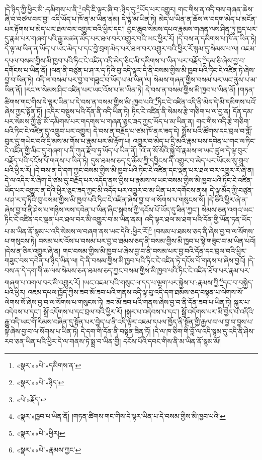 །དེ་ཉིད་ཀྱི་ཕྱིར་མི་:དམིགས་པ་ནི་\footnote{«སྣར་»«པེ་»དམིགས་ན་}འདི་ཇི་ལྟར་ཞི་བ་:ཉིད་དུ་\footnote{«སྣར་»«པེ་»ཉིད་}ཡོད་པར་འགྱུར། གང་གིས་ན་འདི་བས་གཞན་ཆེས་ཞི་བ་བཙལ་བར་བྱ། འདི་ཡོད་པ་ཁོ་ན་མ་ཡིན་ནམ། དེ་ལྟ་མ་ཡིན་ཏེ། མེད་པ་ཡིན་ན་ཆོས་ལ་བདག་མེད་པ་མངོན་པར་རྟོགས་པ་མེད་པར་ཐལ་བར་འགྱུར་བའི་ཕྱིར་དང་། བྱང་ཆུབ་སེམས་དཔའ་རྣམས་གཞན་ལས་ཤིན་ཏུ་ཁྱད་པར་དུ་རྣམ་པར་གཞག་པའི་རྒྱུ་མཚན་མེད་པར་ཐལ་བར་འགྱུར་བའི་ཡང་ཕྱིར་རོ། །དེ་བས་ན་དམིགས་པ་ཁོ་ན་ཡིན་ཏེ། དེ་ལྟ་མ་ཡིན་ན་ཡོད་པ་ཡང་མེད་པ་དང་བྱེ་བྲག་མེད་པར་ཐལ་བར་འགྱུར་བའི་ཕྱིར་རོ་སྙམ་དུ་སེམས་པ་ལ། འཇམ་དཔལ་བསམ་གྱིས་མི་ཁྱབ་པའི་ཏིང་ངེ་འཛིན་འདི་མེད་ཅིང་མི་དམིགས་པ་ཡིན་པར་བརྗོད་\footnote{«པེ་»རྗོད་}དམ་ཅི་ཞེས་བྱ་བ་དགོངས་པ་ཡིན་ནོ། །ལན་ནི་བཙུན་པ་ཤ་ར་དྭ་ཏིའི་བུ་འདི་ལྟར་དེ་ནི་བསམ་གྱིས་མི་ཁྱབ་པའི་ཏིང་ངེ་འཛིན་ཏེ་ཞེས་བྱ་བ་ཡིན་ཏེ། འདི་ལ་བསམ་པར་བྱ་བ་གཟུང་བ་ཡོད་པ་མ་ཡིན་ལ། སེམས་གཞན་གྱིས་བསམ་པར་ཡང་ནུས་པ་མ་ཡིན་ནོ། །རང་ལ་སེམས་ཤིང་འཛིན་པར་ཡང་འོས་པ་མ་ཡིན་ཏེ། དེ་བས་ན་བསམ་གྱིས་མི་ཁྱབ་པ་ཡིན་ནོ། །གཏན་ཚིགས་གང་གིས་དེ་ལྟར་ཡིན་པ་དེ་བས་ན་བསམ་གྱིས་མི་:ཁྱབ་པའི་\footnote{«སྣར་»ཁྱབ་པ་ཡིན་ནོ། །གཏན་ཚིགས་གང་གིས་དེ་ལྟར་ཡིན་པ་དེ་བསམ་གྱིས་མི་ཁྱབ་པའི་}ཏིང་ངེ་འཛིན་འདི་ནི་མེད་དེ་མི་དམིགས་པའོ་ཞེས་ཀྱང་སྟོན་ཏོ། །འདིར་བསྡུས་པའི་དོན་ནི་འདི་ཡིན་ཏེ། ཏིང་ངེ་འཛིན་ནི་སེམས་རྩེ་གཅིག་པ་ལ་བྱ་ན། དོན་དམ་པར་སེམས་ཀྱི་རྩེ་མོ་དམིགས་པར་གདགས་པ་གཞན་ཅུང་ཟད་ཀྱང་ཡོད་པ་མ་ཡིན་ན། གང་གིས་འདི་རྩེ་གཅིག་པའི་ཏིང་ངེ་འཛིན་དུ་འགྲུབ་པར་འགྱུར། དེ་བས་ན་བརྗོད་པ་ཙམ་ཁོ་ནར་ཟད་དེ། སྤྲོས་པའི་ཚོགས་དང་བྲལ་བ་གློ་བུར་དུ་གཡེང་བའི་དྲི་མས་མ་གོས་པ་རྣམ་པར་མི་རྟོག་པ། འགྱུར་བ་མེད་པ་དྲི་མའི་རྣམ་པས་དབེན་པ་གང་ལ་ཏིང་ངེ་འཛིན་གྱི་མིང་དུ་གཞག་པ་ནི་ཀུན་རྫོབ་ཏུ་ཡོད་པ་ཡིན་ནོ། །འོ་ན་སོ་སོའི་སྐྱེ་བོ་རྣམས་ལ་ཡང་ཚུལ་དེ་ལྟ་བུར་བརྗོད་པའི་དངོས་པོ་གནས་པ་ཡིན་ཏེ། དུས་ཐམས་ཅད་དུ་ཆོས་ཀྱི་དབྱིངས་ནི་འགྱུར་བ་མེད་པར་ཡོངས་སུ་གྲུབ་པའི་ཕྱིར་རོ། །དེ་བས་ན་དེ་དག་ཀྱང་བསམ་གྱིས་མི་ཁྱབ་པའི་ཏིང་ངེ་འཛིན་དང་ལྡན་པར་ཐལ་བར་འགྱུར་རོ་ཞེ་ན། དེ་ལ་འདིར་རེ་ཞིག་དེ་ཙམ་དུ་བརྗོད་པར་འདོད་ནས་བྱིས་པ་རྣམས་ལ་ཡང་བསམ་གྱིས་མི་ཁྱབ་པའི་ཏིང་ངེ་འཛིན་ཡོད་པར་འགྱུར་ན་དེའི་ཕྱིར་ཅུང་ཟད་ཀྱང་མི་འདོད་པར་འགྱུར་བ་མ་ཡིན་པར་དགོངས་ནས། དེ་ལྟ་མོད་ཀྱི་བཙུན་པ་ཤ་ར་དྭ་ཏིའི་བུ་བསམ་གྱིས་མི་ཁྱབ་པའི་ཏིང་ངེ་འཛིན་ཞེས་བྱ་བ་ལ་སོགས་པ་གསུངས་སོ། །དེ་ཅིའི་ཕྱིར་ཞེ་ན་ཞེས་བྱ་བ་ནི་ཤེས་པ་གཉིས་ལས་དབེན་པ་ཡིན་ཞིང་སྐབས་ཀྱི་དངོས་པོ་ཡོད་དུ་ཟིན་ཀྱང་། སེམས་ཅན་འགའ་ཡང་ཏིང་ངེ་འཛིན་དང་ལྡན་པར་ཐལ་བར་མི་འགྱུར་བ་མ་ཡིན་ནམ། འདི་ལྟར་ཐལ་མ་ཐག་པའི་དོན་གྱི་ཡོན་ཏན་ཡོད་པ་མ་ཡིན་ནོ་སྙམ་པ་འདི་སེམས་ལ་བཞག་ནས་ཡང་དེའི་:ཕྱིར་རོ།\footnote{«སྣར་»«པེ་»ཕྱིར།} །བསམ་པ་ཐམས་ཅད་ནི་ཞེས་བྱ་བ་ལ་སོགས་པ་གསུངས་ཏེ། བསམ་པར་འོས་པ་བསམ་པར་བྱ་བ་ཐམས་ཅད་ནི་བསམ་གྱིས་མི་ཁྱབ་པ་སྟེ་གཟུང་བ་མ་ཡིན་པའོ། །དེས་ན་ཅིར་འགྱུར་ཞེ་ན། གང་བསམ་གྱིས་མི་ཁྱབ་པ་ཞེས་བྱ་བ་ནི་བསམ་པར་བྱ་བའི་དོན་དང་བྲལ་བའི་ཕྱིར་གཟུང་བས་དབེན་པ་ཉིད་ཡིན་ལ། དེ་ནི་བསམ་གྱིས་མི་ཁྱབ་པའི་ཏིང་ངེ་འཛིན་ཏེ་དངོས་པོ་གནས་པ་ཞེས་བྱའོ། །དེ་བས་ན་དེ་དག་གི་ཆ་ལས་སེམས་ཅན་ཐམས་ཅད་ཀྱང་བསམ་གྱིས་མི་ཁྱབ་པའི་ཏིང་ངེ་འཛིན་ཐོབ་པར་རྣམ་པར་གཞག་པ་འགལ་བར་མི་འགྱུར་རོ། །ཡང་འཇམ་པའི་གསུང་ལ་དད་པ་ལྷག་པར་སྐྱེས་པ་:རྣམས་ཀྱི་\footnote{«སྣར་»«པེ་»རྣམས་ཀྱང་}དང་བ་བསྐྱེད་པའི་ཕྱིར། འཇམ་དཔལ་ཁྱོད་ཀྱིས་ཟབ་མོ་ཟབ་པའི་གནས་འདི་ལྟ་བུ་འདི་དག་ཐམས་ཅད་བསྟན་པ་ལེགས་སོ་ལེགས་སོ་ཞེས་བྱ་བ་ལ་སོགས་པ་གསུངས་ཏེ། ཟབ་མོ་ཟབ་པའི་གནས་ཞེས་བྱ་བ་ནི་དོན་ཟབ་པ་ཡིན་ཏེ། སྐུར་པ་འདེབས་པ་དང་། སྒྲོ་འདོགས་པ་དང་བྲལ་བའི་ཕྱིར་རོ། །སྐུར་པ་འདེབས་པ་དང་། སྒྲོ་འདོགས་པར་མི་བྱེད་པ་འདིའི་རྒྱུ་འདི་ཡང་གོ་རིམས་བཞིན་དུ་སྟོན་པར་བྱེད་པ་ནི་འདི་ལྟར་འཇམ་དཔལ་ཁྱོད་ནི་སྔོན་གྱི་རྒྱལ་བ་ལ་བྱ་བ་བྱས་པ་སྟེ་ཞེས་བྱ་བ་ལ་སོགས་པ་ཡིན་ཏེ། དེ་དག་གི་དོན་ནི་བསྟན་ཟིན་ཏོ། །དེ་ལ་ཁ་ཅིག་གི་བློ་ལ་འདི་སྙམ་དུ་འདི་ནི་ཤེས་རབ་ཅན་ཡིན་པའི་ཕྱིར་དེ་ལ་གནས་ཏེ་སྨྲ་བ་ཡིན་གྱི། དངོས་པོའི་དབང་གིས་ནི་མ་ཡིན་ནོ་སྙམ་མོ། 